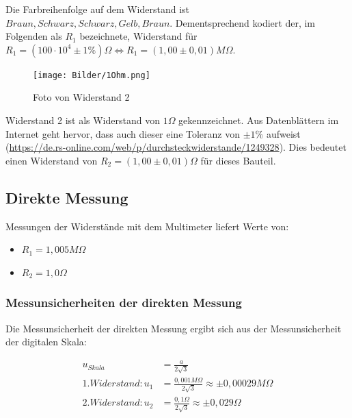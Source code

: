 \documentclass[
  9pt,
]{article}
\begin{document}
Die Farbreihenfolge auf dem Widerstand ist
\(Braun, Schwarz, Schwarz, Gelb, Braun\). Dementsprechend kodiert der,
im Folgenden als \(R_1\) bezeichnete, Widerstand für
\(R_1 = (100 \cdot 10^4\pm 1\% ) \Omega \Leftrightarrow R_1=(1,00\pm 0,01) M\Omega\).

\begin{figure}
\centering
\texttt{[image: Bilder/1Ohm.png]}
\caption{Foto von Widerstand 2}
\end{figure}

Widerstand 2 ist als Widerstand von \(1\Omega\) gekennzeichnet. Aus
Datenblättern im Internet geht hervor, dass auch dieser eine Toleranz
von \(\pm 1 \%\) aufweist
(\url{https://de.rs-online.com/web/p/durchsteckwiderstande/1249328}).
Dies bedeutet einen Widerstand von \(R_2=(1,00 \pm 0,01)\Omega\) für
dieses Bauteil.

\hypertarget{direkte-messung}{%
\subsection{Direkte Messung}\label{direkte-messung}}

Messungen der Widerstände mit dem Multimeter liefert Werte von:

\begin{itemize}
\item $R_1 = 1,005 M\Omega$\\
\item $R_2 = 1,0 \Omega$
\end{itemize}

\hypertarget{messunsicherheiten-der-direkten-messung}{%
\subsubsection{Messunsicherheiten der direkten
Messung}\label{messunsicherheiten-der-direkten-messung}}

Die Messunsicherheit der direkten Messung ergibt sich aus der
Messunsicherheit der digitalen Skala:

\begin{equation*}
\begin{split}
u_{Skala} &=\frac{a}{2\sqrt{3}} \\
1.Widerstand: u_1 &= \frac{0,001M\Omega}{2\sqrt{3}} \approx \pm 0,00029 M\Omega \\
2.Widerstand: u_2 &= \frac{0,1\Omega}{2\sqrt{3}} \approx \pm 0,029\Omega 
\end{split}
\end{equation*}
\end{document}
